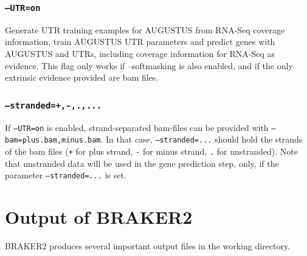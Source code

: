 \documentclass[a4paper,10pt]{report}
\begin{document}
\subsection{\texttt{--UTR=on}} Generate UTR training examples for AUGUSTUS from RNA-Seq coverage information, train AUGUSTUS UTR parameters and predict genes with AUGUSTUS and UTRs, including coverage information for RNA-Seq as evidence. This flag only works if --softmasking is also enabled, and if the only extrinsic evidence provided are bam files.

\subsection{\texttt{--stranded=+,-,.,...}} If \texttt{--UTR=on} is enabled, strand-separated bam-files can be provided with \texttt{--bam=plus.bam,minus.bam}. In that case, \texttt{--stranded=...} should hold the strands of the bam files (\texttt{+} for plus strand, \texttt{-} for minus strand, \texttt{.} for unstranded). Note that unstranded data will be used in the gene prediction step, only, if the parameter \texttt{--stranded=...} is set.

\chapter{Output of BRAKER2}

BRAKER2 produces several important output files in the working directory. 
\end{document}
